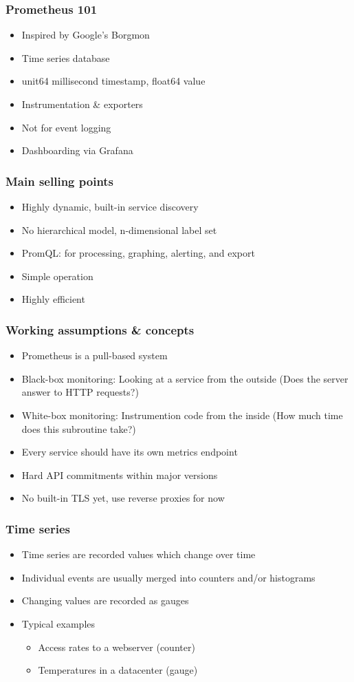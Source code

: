 \documentclass[aspectratio=169]{beamer}
\begin{document}
\begin{frame}
	\frametitle{Prometheus 101}
	\begin{itemize}
		\item Inspired by Google's Borgmon
		\item Time series database
		\item unit64 millisecond timestamp, float64 value
		\item Instrumentation \& exporters
		\item Not for event logging
		\item Dashboarding via Grafana
	\end{itemize}
\end{frame}

\begin{frame}
	\frametitle{Main selling points}
	\begin{itemize}
		\item Highly dynamic, built-in service discovery
		\item No hierarchical model, n-dimensional label set
		\item PromQL: for processing, graphing, alerting, and export
		\item Simple operation
		\item Highly efficient
	\end{itemize}
\end{frame}

\begin{frame}
	\frametitle{Working assumptions \& concepts}
	\begin{itemize}
		\item Prometheus is a pull-based system
		\item Black-box monitoring: Looking at a service from the outside (Does the server answer to HTTP requests?)
		\item White-box monitoring: Instrumention code from the inside (How much time does this subroutine take?)
		\item Every service should have its own metrics endpoint
		\item Hard API commitments within major versions
		\item No built-in TLS yet, use reverse proxies for now
	\end{itemize}
\end{frame}

\begin{frame}
	\frametitle{Time series}
	\begin{itemize}
		\item Time series are recorded values which change over time
		\item Individual events are usually merged into counters and/or histograms
		\item Changing values are recorded as gauges
		\item Typical examples
		\begin{itemize}
			\item Access rates to a webserver (counter)
			\item Temperatures in a datacenter (gauge)
		\end{itemize}
	\end{itemize}
\end{frame}
\end{document}
